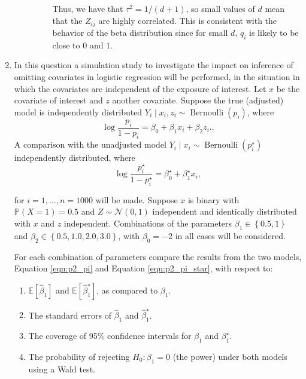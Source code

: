 \documentclass[letterpaper,11pt]{article}
\begin{document}
\begin{enumerate}
\begin{enumerate}
\begin{description}
      Thus, we have that $\boxed{\tau^2 = 1/\left(d + 1\right)}$, so small
      values of $d$ mean that the $Z_{ij}$ are highly correlated. This is
      consistent with the behavior of the beta distribution since for small $d$,
      $q_i$ is likely to be close to $0$ and $1$.
    \end{description}
\end{enumerate}
\item In this question a simulation study to investigate the impact on inference
  of omitting covariates in logistic regression will be performed, in the
  situation in which the covariates are independent of the exposure of
  interest. Let $x$ be the covariate of interest and $z$ another
  covariate. Suppose the true (adjusted) model is independently distributed
  $Y_i \mid x_i,z_i \sim \operatorname{Bernoulli}\left(p_i\right)$, where
  \begin{equation}
    \log\frac{p_i}{1 - p_i} = \beta_0 + \beta_1x_i + \beta_2z_i.
    \label{eqn:p2_pi}.
  \end{equation}
  A comparison with the unadjusted model
  $Y_i \mid x_i \sim \operatorname{Bernoulli}\left(p_i^\star\right)$
  independently distributed, where
  \begin{equation}
    \log\frac{p_i^\star}{1 - p_i^\star} = \beta_0^\star + \beta_1^\star x_i,
    \label{eqn:p2_pi_star}
  \end{equation}

  for $i = 1,\ldots,n=1000$ will be made. Suppose $x$ is binary with
  $\mathbb{P}\left(X = 1\right) = 0.5$ and $Z \sim \mathcal{N}\left(0, 1\right)$
  independent and identically distributed with $x$ and $z$
  independent. Combinations of the parameters
  $\beta_1 \in \left\{ 0.5, 1 \right\}$ and
  $\beta_2 \in \left\{0.5,1.0,2.0,3.0\right\}$, with $\beta_0 = -2$ in all cases
  will be considered.

  For each combination of parameters compare the results from the two models,
  Equation \ref{eqn:p2_pi} and Equation \ref{eqn:p2_pi_star}, with respect to:
  \begin{enumerate}
  \item $\mathbb{E}\left[\hat{\beta}_1\right]$ and
    $\mathbb{E}\left[\hat{\beta}_1^\star\right]$, as compared to $\beta_1$.
  \item The standard errors of $\hat{\beta}_1$ and $\hat{\beta}_1^\star$.
  \item The coverage of 95\% confidence intervals for $\beta_1$ and
    $\beta_1^\star$.
  \item The probability of rejecting $H_0 : \beta_1 = 0$ (the power) under both
    models using a Wald test.
  \end{enumerate}


\end{enumerate}
\end{document}
